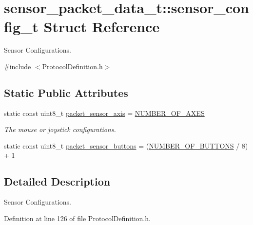 \hypertarget{structsensor__packet__data__t_1_1sensor__config__t}{\section{sensor\-\_\-packet\-\_\-data\-\_\-t\-:\-:sensor\-\_\-config\-\_\-t \-Struct \-Reference}
\label{structsensor__packet__data__t_1_1sensor__config__t}
}


\-Sensor \-Configurations.  




{\ttfamily \#include $<$\-Protocol\-Definition.\-h$>$}

\subsection*{\-Static \-Public \-Attributes}
\begin{DoxyCompactItemize}
\item 
static const uint8\-\_\-t \hyperlink{structsensor__packet__data__t_1_1sensor__config__t_a08799719eba394b5e4486395e2684ab8}{packet\-\_\-sensor\-\_\-axis} = \hyperlink{_user_defines_8h_ab8c9a6337842c60c8020cd45c44ed816}{\-N\-U\-M\-B\-E\-R\-\_\-\-O\-F\-\_\-\-A\-X\-E\-S}
\begin{DoxyCompactList}\small\item\em \-The mouse or joystick configurations. \end{DoxyCompactList}\item 
static const uint8\-\_\-t \hyperlink{structsensor__packet__data__t_1_1sensor__config__t_a65f2fd63d76f7ac9326d8f7d6da892e1}{packet\-\_\-sensor\-\_\-buttons} = (\hyperlink{_user_defines_8h_a8b5882947b9bdf6ffd31ba94bcc42aef}{\-N\-U\-M\-B\-E\-R\-\_\-\-O\-F\-\_\-\-B\-U\-T\-T\-O\-N\-S} / 8) + 1
\end{DoxyCompactItemize}


\subsection{\-Detailed \-Description}
\-Sensor \-Configurations. 

\-Definition at line 126 of file \-Protocol\-Definition.\-h.



